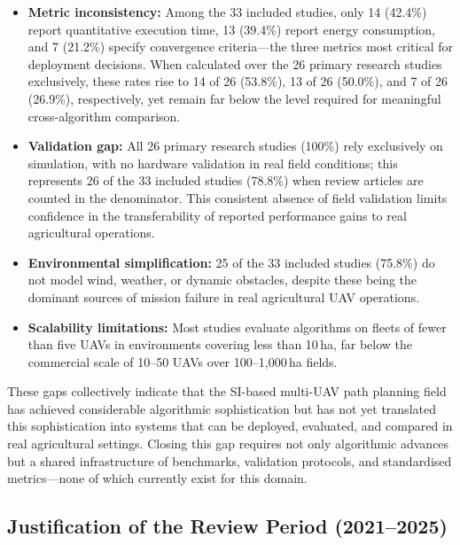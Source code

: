 \documentclass[review,3p,times]{elsarticle}
\begin{document}
\begin{itemize}
  \item \textbf{Metric inconsistency:} Among the 33 included studies, only 14 (42.4\%)
  report quantitative execution time, 13 (39.4\%) report energy consumption, and
  7 (21.2\%) specify convergence criteria---the three metrics most critical for
  deployment decisions. When calculated over the 26 primary research studies
  exclusively, these rates rise to 14 of 26 (53.8\%), 13 of 26 (50.0\%), and
  7 of 26 (26.9\%), respectively, yet remain far below the level required for
  meaningful cross-algorithm comparison.

  \item \textbf{Validation gap:} All 26 primary research studies (100\%) rely
  exclusively on simulation, with no hardware validation in real field conditions;
  this represents 26 of the 33 included studies (78.8\%) when review articles are
  counted in the denominator. This consistent absence of field validation limits
  confidence in the transferability of reported performance gains to real agricultural
  operations.

  \item \textbf{Environmental simplification:} 25 of the 33 included studies (75.8\%)
  do not model wind, weather, or dynamic obstacles, despite these being the dominant
  sources of mission failure in real agricultural UAV operations.

  \item \textbf{Scalability limitations:} Most studies evaluate algorithms on fleets
  of fewer than five UAVs in environments covering less than 10\,ha, far below the
  commercial scale of 10--50 UAVs over 100--1,000\,ha fields.
\end{itemize}

These gaps collectively indicate that the SI-based multi-UAV path planning field has achieved considerable algorithmic sophistication but has not yet translated this sophistication into systems that can be deployed, evaluated, and compared in real agricultural settings. Closing this gap requires not only algorithmic advances but a shared infrastructure of benchmarks, validation protocols, and standardised metrics---none of which currently exist for this domain.

\subsection{Justification of the Review Period (2021--2025)}
\end{document}

